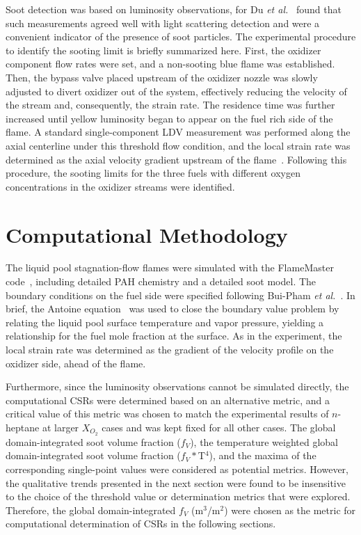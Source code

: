 \documentclass[review,3p,times]{elsarticleUS}
\begin{document}
Soot detection was based on luminosity observations, for Du \emph{et al.}~\cite{du89} found that such measurements agreed well with light scattering detection and were a convenient indicator of the presence of soot particles. The experimental procedure to identify the sooting limit is briefly summarized here. First, the oxidizer component flow rates were set, and a non-sooting blue flame was established. Then, the bypass valve placed upstream of the oxidizer nozzle was slowly adjusted to divert oxidizer out of the system, effectively reducing the velocity of the stream and, consequently, the strain rate. The residence time was further increased until yellow luminosity began to appear on the fuel rich side of the flame. A standard single-component LDV measurement was performed along the axial centerline under this threshold flow condition, and the local strain rate was determined as the axial velocity gradient upstream of the flame~\cite{du89}. Following this procedure, the sooting limits for the three fuels with different oxygen concentrations in the oxidizer streams were identified.

\section{Computational Methodology}

The liquid pool stagnation-flow flames were simulated with the FlameMaster code~\cite{flamemaster}, including detailed PAH chemistry and a detailed soot model. The boundary conditions on the fuel side were specified following Bui-Pham \emph{et al.}~\cite{buipham91}. In brief, the Antoine equation~\cite{polingbook} was used to close the boundary value problem by relating the liquid pool surface temperature and vapor pressure, yielding a relationship for the fuel mole fraction at the surface. As in the experiment, the local strain rate was determined as the gradient of the velocity profile on the oxidizer side, ahead of the flame. 

Furthermore, since the luminosity observations cannot be simulated directly, the computational CSRs were determined based on an alternative metric, and a critical value of this metric was chosen to match the experimental results of $n$-heptane at larger $X_{O_2}$ cases and was kept fixed for all other cases.  The global domain-integrated soot volume fraction ($f_V$), the temperature weighted global domain-integrated soot volume fraction ($f_V*$T$^4$), and the maxima of the corresponding single-point values were considered as potential metrics.  However, the qualitative trends presented in the next section were found to be insensitive to the choice of the threshold value or determination metrics that were explored.  Therefore, the global domain-integrated $f_V$ (m$^3$/m$^2$) were chosen as the metric for computational determination of CSRs in the following sections.
\end{document}
